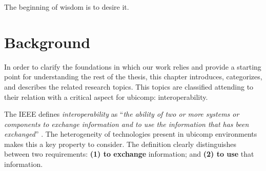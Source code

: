 
\begin{savequote}[50mm]
The beginning of wisdom is to desire it.
\end{savequote}


\chapter{Background}
\label{cha:stateoftheart}

\ifpdf
    \graphicspath{{\pathchaptwo/figures/PNG/}{\pathchaptwo/figures/PDF/}{\pathchaptwo/figures/}}
\else
    \graphicspath{{\pathchaptwo/figures/EPS/}{\pathchaptwo/figures/}}
\fi



In order to clarify the foundations in which our work relies and provide a starting point for understanding the rest of the thesis,
this chapter introduces, categorizes, and describes the related research topics. %
This topics are classified attending to their relation with a critical aspect for \ac{ubicomp}: interoperability.



The IEEE defines \emph{interoperability} as ``\emph{the ability of two or more systems or components to exchange information and to use the information that has been exchanged}'' \citep{_ieee_1990}.
The heterogeneity of technologies present in \ac{ubicomp} environments makes this a key property to consider.
The definition clearly distinguishes between two requirements: %
\textbf{(1) to exchange} information; and
\textbf{(2) to use} that information. %

\medskip

